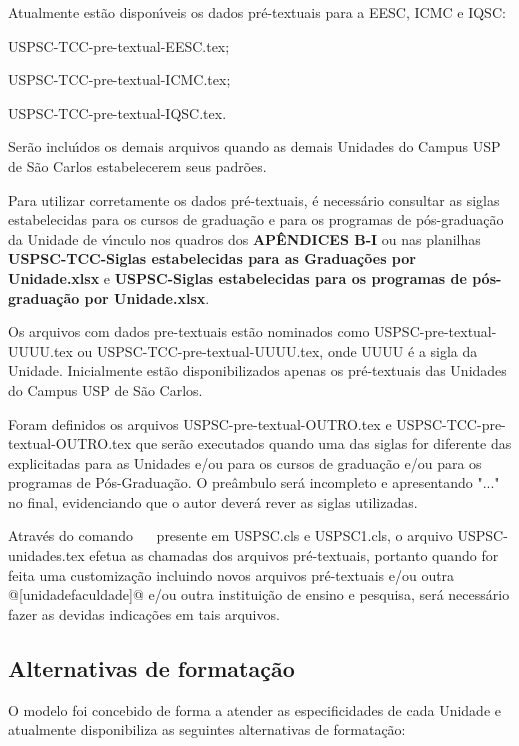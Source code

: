 Atualmente est\~ao dispon\'{\i}veis os dados pr\'e-textuais para a EESC, ICMC e IQSC:
			
			\begin{alineas}	 
				\item USPSC-TCC-pre-textual-EESC.tex;
				\item USPSC-TCC-pre-textual-ICMC.tex;
				\item USPSC-TCC-pre-textual-IQSC.tex.
			\end{alineas}
			
Ser\~ao inclu\'{\i}dos os demais arquivos quando as demais Unidades do Campus USP de S\~ao Carlos estabelecerem seus padr\~oes. 
			
Para utilizar corretamente os dados pr\'e-textuais, \'e necess\'ario consultar as siglas estabelecidas para os cursos de gradua\c{c}\~ao e para os programas de p\'os-gradua\c{c}\~ao da Unidade de v\'{\i}nculo nos quadros dos \textbf{AP\^ENDICES B-I} ou nas planilhas \textbf{USPSC-TCC-Siglas estabelecidas para as Gradua\c{c}\~oes por Unidade.xlsx} e \textbf{USPSC-Siglas estabelecidas para os programas de p\'os-gradua\c{c}\~ao por Unidade.xlsx}. 

Os arquivos com dados pre-textuais est\~ao nominados como USPSC-pre-textual-UUUU.tex ou USPSC-TCC-pre-textual-UUUU.tex, onde UUUU \'e a sigla da Unidade. Inicialmente est\~ao disponibilizados apenas os pr\'e-textuais das Unidades do Campus USP de S\~ao Carlos.
			
Foram definidos os arquivos USPSC-pre-textual-OUTRO.tex e USPSC-TCC-pre-textual-OUTRO.tex que ser\~ao executados quando uma das siglas for diferente das explicitadas para as Unidades e/ou para os cursos de gradua\c{c}\~ao e/ou para os programas de P\'os-Gradua\c{c}\~ao. O pre\^ambulo ser\'a incompleto e apresentando "..." no final, evidenciando que o autor dever\'a rever as siglas utilizadas.

Atrav\'es do comando \verb+  + presente em USPSC.cls e USPSC1.cls,  o arquivo USPSC-unidades.tex efetua as chamadas dos arquivos pr\'e-textuais, portanto quando for feita uma customiza\c{c}\~ao incluindo novos arquivos pr\'e-textuais e/ou outra @[unidadefaculdade]@ e/ou outra institui\c{c}\~ao de ensino e pesquisa, ser\'a necess\'ario fazer as devidas indica\c{c}\~oes em tais arquivos. 
	 
\subsection{Alternativas de formata\c{c}\~ao}
O modelo foi concebido de forma a atender as especificidades de cada Unidade e atualmente disponibiliza as seguintes alternativas de formata\c{c}\~ao:
